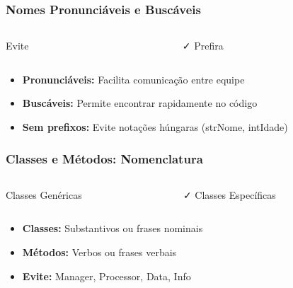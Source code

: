 \documentclass[aspectratio=169]{beamer}
\begin{document}
\begin{frame}
\frametitle{Nomes Pronunciáveis e Buscáveis}

\begin{columns}
\begin{column}{0.5\textwidth}
\begin{block}{\textcolor{cleanred}{\faTimes} Evite}

\end{block}
\end{column}

\begin{column}{0.5\textwidth}
\begin{block}{\textcolor{cleangreen}{\faCheck} Prefira}

\end{block}
\end{column}
\end{columns}

\vspace{0.5cm}
\begin{itemize}
    \item \textbf{Pronunciáveis:} Facilita comunicação entre equipe
    \item \textbf{Buscáveis:} Permite encontrar rapidamente no código
    \item \textbf{Sem prefixos:} Evite notações húngaras (strNome, intIdade)
\end{itemize}
\end{frame}

\begin{frame}
\frametitle{Classes e Métodos: Nomenclatura}

\begin{columns}
\begin{column}{0.5\textwidth}
\begin{block}{\textcolor{cleanred}{\faTimes} Classes Genéricas}

\end{block}
\end{column}

\begin{column}{0.5\textwidth}
\begin{block}{\textcolor{cleangreen}{\faCheck} Classes Específicas}

\end{block}
\end{column}
\end{columns}

\vspace{0.5cm}
\begin{itemize}
    \item \textbf{Classes:} Substantivos ou frases nominais
    \item \textbf{Métodos:} Verbos ou frases verbais
    \item \textbf{Evite:} Manager, Processor, Data, Info
\end{itemize}
\end{frame}
\end{document}
